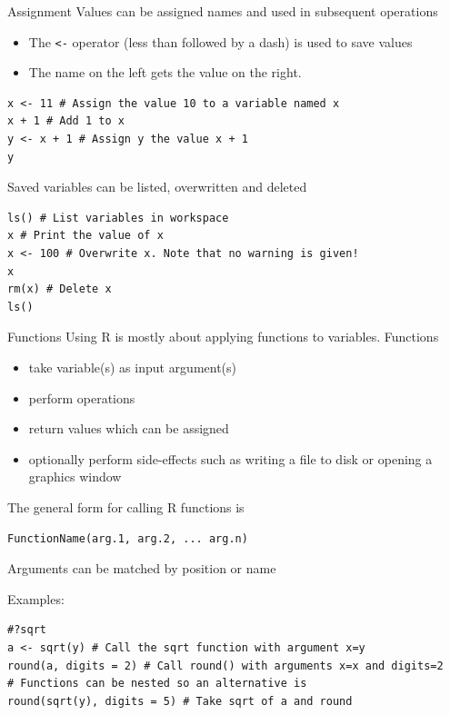 \documentclass[table,smaller]{beamer}
\begin{document}
\begin{frame}[fragile,label=sec-3-1]{Assignment}
 Values can be assigned names and used in subsequent operations
\begin{itemize}
\item The \verb~<-~ operator (less than followed by a dash) is used to save values
\item The name on the left gets the value on the right.
\end{itemize}

\begin{verbatim}
x <- 11 # Assign the value 10 to a variable named x
x + 1 # Add 1 to x
y <- x + 1 # Assign y the value x + 1
y
\end{verbatim}


Saved variables can be listed, overwritten and deleted
\begin{verbatim}
ls() # List variables in workspace
x # Print the value of x
x <- 100 # Overwrite x. Note that no warning is given!
x
rm(x) # Delete x
ls()
\end{verbatim}
\end{frame}


\begin{frame}[fragile,label=sec-3-2]{Functions}
 Using R is mostly about applying \alert{functions} to \alert{variables}. Functions
\begin{itemize}
\item take \alert{variable(s)} as input \alert{argument(s)}
\item perform operations
\item \alert{return} values which can be \alert{assigned}
\item optionally perform side-effects such as writing a file to disk or opening a graphics window
\end{itemize}

The general form for calling R functions is 
\begin{verbatim}
FunctionName(arg.1, arg.2, ... arg.n)
\end{verbatim}

Arguments can be matched by position or name

Examples:
\begin{verbatim}
#?sqrt
a <- sqrt(y) # Call the sqrt function with argument x=y
round(a, digits = 2) # Call round() with arguments x=x and digits=2
# Functions can be nested so an alternative is
round(sqrt(y), digits = 5) # Take sqrt of a and round
\end{verbatim}
\end{frame}
\end{document}
